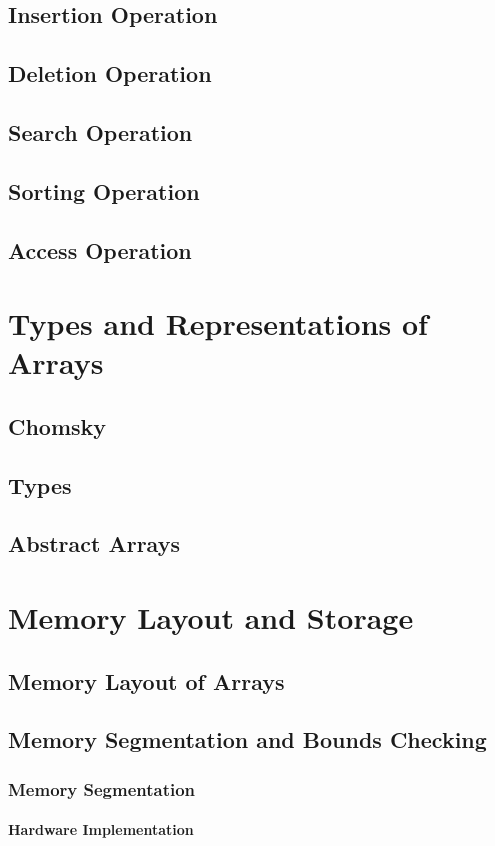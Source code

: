 \documentclass[12pt, oneside]{book}
\begin{document}
	\section{Insertion Operation}
	\section{Deletion Operation}
	\section{Search Operation}
	\section{Sorting Operation}
	\section{Access Operation}
	\chapter{Types and Representations of Arrays}
	\section{Chomsky}
	\section{Types}
	\section{Abstract Arrays}
	\chapter{Memory Layout and Storage}
	\section{Memory Layout of Arrays}
	\section{Memory Segmentation and Bounds Checking}
	\subsection{Memory Segmentation}
	\subsubsection{Hardware Implementation}
\end{document}
